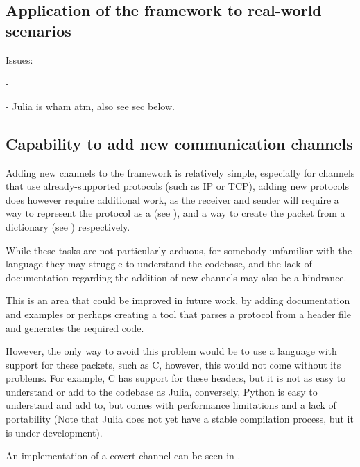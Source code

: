 \subsection{Application of the framework to real-world scenarios}

Issues:

- 

- Julia is wham atm, also see sec below.


\subsection{Capability to add new communication channels}

Adding new channels to the framework is relatively simple, especially for channels that use already-supported protocols (such as IP or TCP), adding new protocols does however require additional work, as the receiver and sender will require a way to represent the protocol as a  (see ), and a way to create the packet from a dictionary (see ) respectively.

While these tasks are not particularly arduous, for somebody unfamiliar with the language they may struggle to understand the codebase, and the lack of documentation regarding the addition of new channels may also be a hindrance.

This is an area that could be improved in future work, by adding documentation and examples or perhaps creating a tool that parses a protocol from a header file and generates the required code.

However, the only way to avoid this problem would be to use a language with support for these packets, such as C, however, this would not come without its problems. For example, C has support for these headers, but it is not as easy to understand or add to the codebase as Julia, conversely, Python is easy to understand and add to, but comes with performance limitations and a lack of portability (Note that Julia does not yet have a stable compilation process, but it is under development).

An implementation of a covert channel can be seen in .